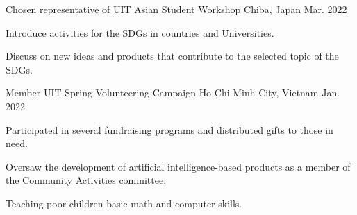 

\begin{cventries}

  \cventry
    {Chosen representative of UIT} %
    {Asian Student Workshop} %
    {Chiba, Japan} %
    {Mar. 2022} %
    {
      \begin{cvitems} %
        \item {Introduce activities for the SDGs in countries and Universities.}
        \item {Discuss on new ideas and products that contribute to the selected topic of the SDGs.}
      \end{cvitems}
    }

  \cventry
    {Member} %
    {UIT Spring Volunteering Campaign} %
    {Ho Chi Minh City, Vietnam} %
    {Jan. 2022} %
    {
      \begin{cvitems} %
        \item {Participated in several fundraising programs and distributed gifts to those in need. }
        \item {Oversaw the development of artificial intelligence-based products as a member of the Community Activities committee.}
        \item {Teaching poor children basic math and computer skills.}
      \end{cvitems}
    }

\end{cventries}
